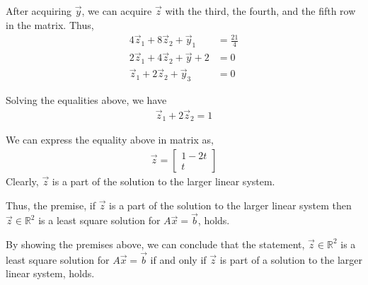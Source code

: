\documentclass[a4paper,10pt]{article}
\begin{document}
\begin{enumerate}
\begin{enumerate}
{\begin{enumerate}
            After acquiring $\vec{y}$, we can acquire $\vec{z}$ with the third, the fourth, and the fifth row in the matrix. Thus,
            \begin{align}
                4\vec{z}_1 + 8\vec{z}_2 + \vec{y}_1 &= \frac{21}{4} \\ 
                2\vec{z}_1 + 4\vec{z}_2 + \vec{y}+2 &= 0 \\
                \vec{z}_1 + 2\vec{z}_2 + \vec{y}_3 &= 0
            \end{align}

            Solving the equalities above, we have 
            \begin{align}
                \vec{z}_1 + 2\vec{z}_2 = 1
            \end{align}

            We can express the equality above in matrix as,
            \begin{align}
                \vec{z} = \begin{bmatrix} 1 - 2t \\ t \end{bmatrix}
            \end{align}
            Clearly, $\vec{z}$ is a part of the solution to the larger linear system.
            
            Thus, the premise, if $\vec{z}$ is a part of the solution to the larger linear system then $\vec{z}\in \mathbb{R}^2$ is a least square solution for $A\vec{x}=\vec{b}$, holds.
        \end{enumerate}

        By showing the premises above, we can conclude that the statement, $\vec{z}\in \mathbb{R}^2$ is a least square solution for $A\vec{x}=\vec{b}$ if and only if $\vec{z}$ is part of a solution to the larger linear system, holds.
    }


\end{enumerate}
\end{enumerate}
\end{document}
